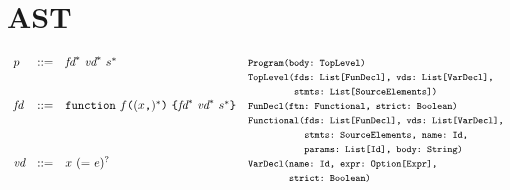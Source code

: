 \chapter{AST}
\small
\[
\begin{array}{llll}
\pgm & ::=  & \fd^*\ \vd^*\ \stmt^* & \mtt{Program(body:~TopLevel)}\\
    &&&\mtt{TopLevel(fds:~List[FunDecl], vds:~List[VarDecl],}\\
&&&\mtt{\phantom{TopLevel(}stmts:~List[SourceElements])}\\

\fd &::=& {\tt function} \ f \verb+(+(x\verb+,+)^*\verb+)+ \ \verb+{+\fd^*\ \vd^*\ \stmt^*\verb+}+
  & \mtt{FunDecl(ftn:~Functional, strict:~Boolean)}\\
&&& \mtt{Functional(fds:~List[FunDecl], vds:~List[VarDecl],}\\
&&&\mtt{\phantom{Functional(}stmts:~SourceElements, name:~Id,}\\
&&&\mtt{\phantom{Functional(}params:~List[Id], body:~String)}\\

\vd &::=& x \ ({\tt =} \ \expr)^? & \mtt{VarDecl(name:~Id, expr:~Option[Expr],}\\
                                       &&& \mtt{\phantom{VarDecl(}strict:~Boolean)}\\


\end{array}\]

